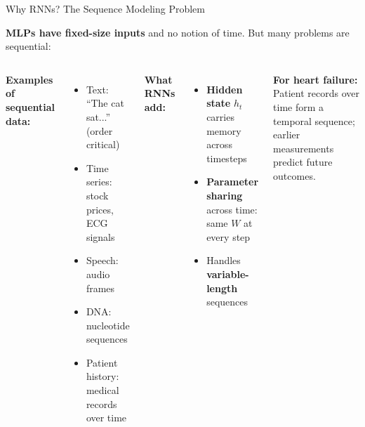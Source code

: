 \documentclass[aspectratio=169]{beamer}
\begin{document}
\begin{frame}{Why RNNs? The Sequence Modeling Problem}

\textbf{MLPs have fixed-size inputs} and no notion of time. But many problems are sequential:

\begin{columns}
\textbf{Examples of sequential data:}
\begin{itemize}
    \item Text: ``The cat sat...'' (order critical)
    \item Time series: stock prices, ECG signals
    \item Speech: audio frames
    \item DNA: nucleotide sequences
    \item Patient history: medical records over time
\end{itemize}

\textbf{What RNNs add:}
\begin{itemize}
    \item \textbf{Hidden state} $h_t$ carries memory across timesteps
    \item \textbf{Parameter sharing} across time: same $W$ at every step
    \item Handles \textbf{variable-length} sequences
\end{itemize}

\vspace{0.3cm}
\textbf{For heart failure:}
Patient records over time form a temporal sequence; earlier measurements predict future outcomes.
\end{columns}
\end{frame}
\end{document}
